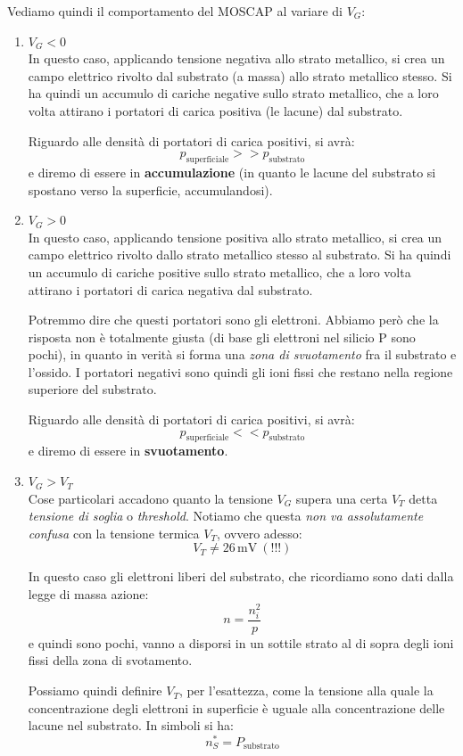 \documentclass[a4paper,11pt]{article}
\begin{document}
Vediamo quindi il comportamento del MOSCAP al variare di $V_G$:
\begin{enumerate}
\item $V_G < 0$ \\
In questo caso, applicando tensione negativa allo strato metallico, si crea un campo elettrico rivolto dal substrato (a massa) allo strato metallico stesso. Si ha quindi un accumulo di cariche negative sullo strato metallico, che a loro volta attirano i portatori di carica positiva (le lacune) dal substrato. 

Riguardo alle densità di portatori di carica positivi, si avrà:
$$
p_\text{superficiale} >> p_\text{substrato}
$$
e diremo di essere in \textbf{accumulazione} (in quanto le lacune del substrato si spostano verso la superficie, accumulandosi).

\item $V_G > 0$ \\
In questo caso, applicando tensione positiva allo strato metallico, si crea un campo elettrico rivolto dallo strato metallico stesso al substrato. Si ha quindi un accumulo di cariche positive sullo strato metallico, che a loro volta attirano i portatori di carica negativa dal substrato. 

Potremmo dire che questi portatori sono gli elettroni. Abbiamo però che la risposta non è totalmente giusta (di base gli elettroni nel silicio P sono pochi), in quanto in verità si forma una \textit{zona di svuotamento} fra il substrato e l'ossido. I portatori negativi sono quindi gli ioni fissi che restano nella regione superiore del substrato.

Riguardo alle densità di portatori di carica positivi, si avrà:
$$
p_\text{superficiale} << p_\text{substrato}
$$
e diremo di essere in \textbf{svuotamento}.

\item $V_G > V_T$ \\
Cose particolari accadono quanto la tensione $V_G$ supera una certa $V_T$ detta \textit{tensione di soglia} o \textit{threshold}. Notiamo che questa \textit{non va assolutamente confusa} con la tensione termica $V_T$, ovvero adesso:
$$
V_T \neq 26 \, \mathrm{mV} \ (\text{!!!})
$$

In questo caso gli elettroni liberi del substrato, che ricordiamo sono dati dalla legge di massa  azione:
$$
n = \frac{n_i^2}{p}
$$
e quindi sono pochi, vanno a disporsi in un sottile strato al di sopra degli ioni fissi della zona di svotamento.

Possiamo quindi definire $V_T$, per l'esattezza, come la tensione alla quale la concentrazione degli elettroni in superficie è uguale alla concentrazione delle lacune nel substrato. In simboli si ha:
$$
n_S^* = P_\text{substrato}
$$


\end{enumerate}
\end{document}
